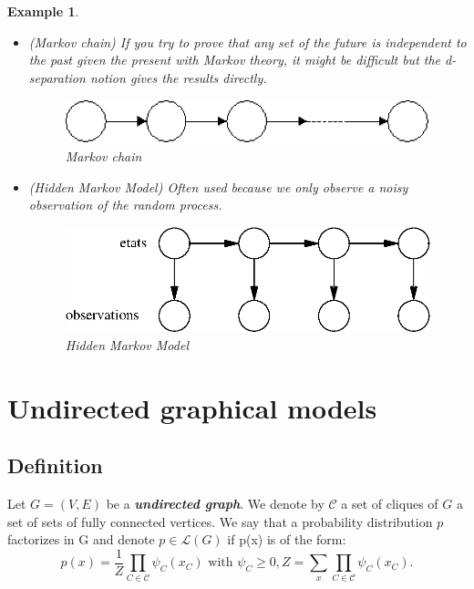 \documentclass[12pt]{report}
\newtheorem{example}{Example}[section]
\begin{document}
\begin{example}
\begin{itemize}
\item (Markov chain) If you try to prove that any set of the future is independent to the past given the present with Markov theory, it might be difficult but the d-separation notion gives the results directly.
\begin{figure}[h!]
\centering
	\includegraphics[scale=1]{markov.eps}
\caption{Markov chain}
\end{figure}

\item (Hidden Markov Model) Often used because we only observe a noisy observation of the random process.
\begin{figure}[h!]
\begin{center}
\includegraphics[scale=1]{hmm.eps}
\end{center}
\caption{Hidden Markov Model}
\end{figure}
\end{itemize}
\end{example}












\section{Undirected graphical models}

\subsection{Definition}

\begin{definition}
Let $G = (V, E)$ be a \emph{\textbf{undirected graph}}. We denote by $\mathcal{C}$ a set of cliques of $G$ \ie a set of sets of fully connected vertices. We say that a probability distribution $p$ factorizes in G and denote $p \in \mathcal{L}(G)$ if p(x) is of the form:
\begin{equation*}
p(x) = \frac{1}{Z} \prod_{C \in \mathcal{C}} \psi_C(x_C) \text{ with } \psi_C \geq 0, Z = \sum_{x}\prod_{C \in \mathcal{C}} \psi_C(x_C).
\end{equation*}
\end{definition}
\end{document}
